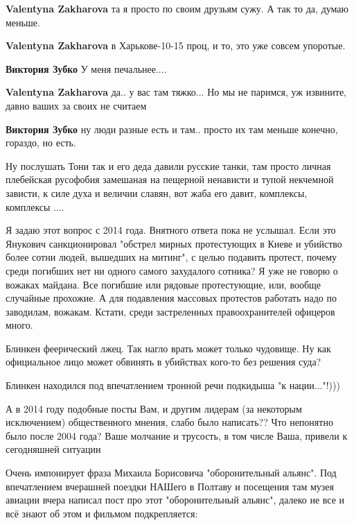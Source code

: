 \begin{itemize}
\begin{itemize}
\textbf{Valentyna Zakharova} та я просто по своим друзьям сужу. А так то да, думаю меньше.

\textbf{Valentyna Zakharova} в Харькове-10-15 проц, и то, это уже совсем упоротые.

\textbf{Виктория Зубко} У меня печальнее....

\textbf{Valentyna Zakharova} да.. у вас там тяжко... Но мы не паримся, уж извините, давно ваших за своих не считаем

\textbf{Виктория Зубко} ну люди разные есть и там.. просто их там меньше конечно, гораздо, но есть.
\end{itemize} %


Ну послушать Тони так и его деда давили русские танки, там просто личная
плебейская русофобия замешаная на пещерной ненависти и тупой некчемной зависти,
к силе духа и величии славян, вот жаба его давит, комплексы, комплексы ....


\obeycr
Я задаю этот вопрос с 2014 года.
Внятного ответа пока не услышал.
Если это Янукович санкционировал "обстрел мирных протестующих в Киеве и убийство более сотни людей, вышедших на митинг", с целью подавить протест, почему среди погибших нет ни одного самого захудалого сотника?
Я уже не говорю о вожаках майдана.
Все погибшие или рядовые протестующие, или, вообще случайные прохожие.
А для подавления массовых протестов работать надо по заводилам, вожакам.
Кстати, среди застреленных правоохранителей офицеров много.
\restorecr


Блинкен феерический лжец. Так нагло врать может только чудовище. Ну как
официальное лицо может обвинять в убийствах кого-то без решения суда?


Блинкен находился под впечатлением тронной речи подкидыша "к нации..."!)))


А в 2014 году подобные посты Вам, и другим лидерам (за некоторым исключением)
общественного мнения, слабо было написать?? Что непонятно было после 2004 года?
Ваше молчание и трусость, в том числе Ваша, привели к сегодняшней ситуации


Очень импонирует фраза Михаила Борисовича "оборонительный альянс". Под
впечатлением вчерашней поездки НАШего в Полтаву и посещения там музея авиации
вчера написал пост про этот "оборонительный альянс", далеко не все и всё знают
об этом и фильмом подкрепляется:


\end{itemize}
